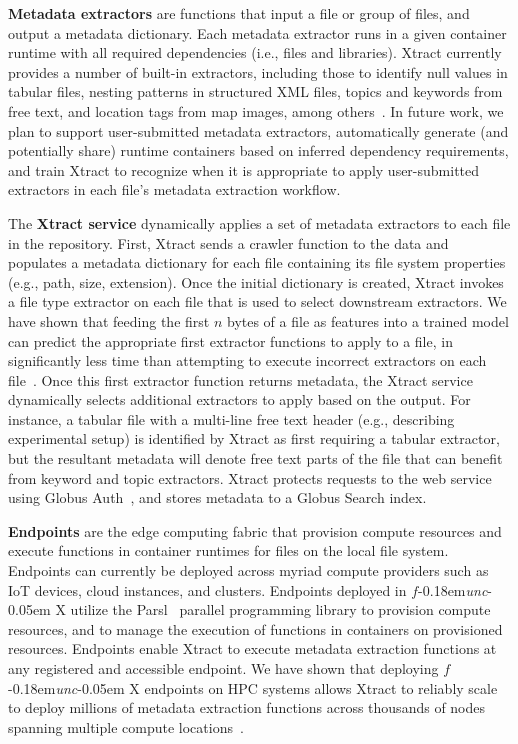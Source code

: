 \documentclass[sigconf, 9pt]{acmart}
\newcommand{\name}{Xtract}
\newcommand{\funcx}{$f$\kern-0.18em\emph{unc}\kern-0.05em X}
\begin{document}
\textbf{Metadata extractors} are functions that input a file or group of files, and output a metadata dictionary. 
Each metadata extractor runs in a given container runtime with all required dependencies (i.e., files and 
libraries).  \name{} currently provides a number of built-in extractors, including
those to identify null values in tabular files, nesting patterns in structured XML files, topics and keywords from free text, and location tags from map images, 
among others~\cite{skluzacek2019serverless}. In future work, 
we plan to support user-submitted metadata extractors, automatically generate (and potentially share) runtime containers based on inferred 
dependency requirements, and train \name{} to recognize when it is appropriate to apply user-submitted extractors in each file's metadata extraction workflow. 

The \textbf{\name{} service} dynamically applies a set of metadata extractors to each file in the repository. 
First, \name{} sends a crawler function to the data and populates a metadata dictionary for each file containing
its file system properties (e.g., path, size, extension).  Once the initial dictionary is created, \name{} invokes a file type extractor on each 
file that is used to select downstream extractors. We have shown that feeding 
the first $n$ bytes of a file as features into 
a trained model can predict the appropriate first extractor functions to apply to a file, in significantly less time
than attempting to execute incorrect extractors on each file~\cite{skluzacek2018skluma}. Once this first extractor function returns metadata, the \name{} service dynamically selects additional extractors to apply based on the output.  For instance, 
a tabular file with a multi-line free text header (e.g., describing experimental setup) is identified by \name{} as first requiring a tabular extractor, but 
the resultant metadata will denote free text parts of the file that can benefit from keyword and topic extractors.
\name{} protects requests to the web service using Globus Auth~\cite{tuecke2016globus}, and stores metadata to a Globus Search index. 

\textbf{Endpoints} are the edge computing fabric that provision compute resources and execute functions in container runtimes for files on the local file system.
 Endpoints can currently be deployed across myriad compute providers such as IoT devices, cloud instances, and clusters.  
Endpoints deployed in \funcx{} utilize the Parsl~\cite{babuji2019parsl} parallel programming library to 
provision compute resources, and to manage the execution of functions in containers on provisioned resources. Endpoints enable 
\name{} to execute metadata extraction functions at any registered and accessible endpoint. 
We have shown that deploying \funcx{} 
endpoints on HPC systems allows \name{} to reliably
scale to deploy millions of metadata extraction functions 
across thousands of nodes spanning multiple compute locations~\cite{chard2019serverless}. 
\end{document}
